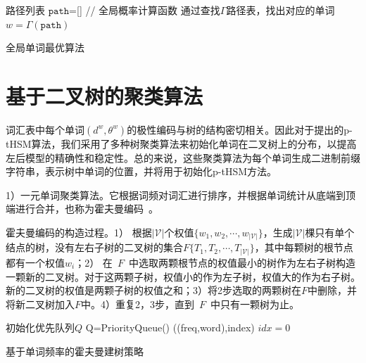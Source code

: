 \begin{algorithm}[!ht]
\SetAlgoLined
{}
 路径列表 $\mathtt{path}$=[] \;
{// 全局概率计算函数}\;
{通过查找$\Gamma$路径表，找出对应的单词}\;
$w=\Gamma(\mathtt{path})$\;
\caption{全局单词最优算法}\label{alog:global}
\end{algorithm}

\section{基于二叉树的聚类算法}
词汇表中每个单词$(d^w,\theta^w)$的极性编码与树的结构密切相关。因此对于提出的p-tHSM算法，我们采用了多种树聚类算法来初始化单词在二叉树上的分布，以提高左后模型的精确性和稳定性。总的来说，这些聚类算法为每个单词生成二进制前缀字符串，表示树中单词的位置，并将用于初始化p-tHSM方法。


1）一元单词聚类算法。它根据词频对词汇进行排序，并根据单词统计从底端到顶端进行合并，也称为霍夫曼编码~。

霍夫曼编码的构造过程。1） 根据$\mathcal{|V|}$个权值$\{w_1,w_2,\cdots,w_{\mathcal{|V|}}\}$，生成$\mathcal{|V|}$棵只有单个结点的树，没有左右子树的二叉树的集合$F\{T_1,T_2,\cdots,T_{\mathcal{|V|}}\}$，其中每颗树的根节点都有一个权值$w_i$；2） 在~$F$~中选取两颗根节点的权值最小的树作为左右子树构造一颗新的二叉树。对于这两颗子树，权值小的作为左子树，权值大的作为右子树。新的二叉树的权值是两颗子树的权值之和；3）将2步选取的两颗树在$F$中删除，并将新二叉树加入$F$中。4）重复2，3步，直到~$F$~中只有一颗树为止。

\begin{algorithm}[!ht]
\SetAlgoLined
{}
{初始化优先队列$Q$}\;
{Q=PriorityQueue()} \;
{((freq,word),index)}\;
{$idx=0$}\;
\caption{基于单词频率的霍夫曼建树策略}\label{code:huffman}
\end{algorithm}


